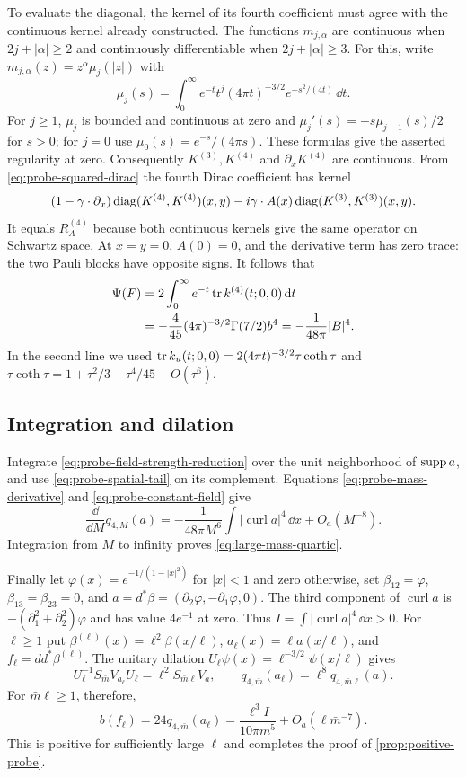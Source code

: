 To evaluate the diagonal, the kernel of its fourth coefficient must
agree with the continuous kernel already constructed. The functions
$m_{j,\alpha}$ are continuous when $2j+|\alpha|\ge2$ and continuously
differentiable when $2j+|\alpha|\ge3$. For this, write
$m_{j,\alpha}(z)=z^\alpha\mu_j(|z|)$ with
\[
 \mu_j(s)=\int_0^\infty e^{-t}t^j(4\pi t)^{-3/2}e^{-s^2/(4t)}\,\dd t.
\]
For $j\ge1$, $\mu_j$ is bounded and continuous at zero and
$\mu_j'(s)=-s\mu_{j-1}(s)/2$ for $s>0$; for $j=0$ use
$\mu_0(s)=e^{-s}/(4\pi s)$. These formulas give the asserted
regularity at zero. Consequently $K^{(3)},K^{(4)}$ and
$\partial_xK^{(4)}$ are continuous. From
\eqref{eq:probe-squared-dirac} the fourth Dirac coefficient has kernel
\[
 (1-\gamma\cdot\partial_x)\operatorname{diag}(K^{(4)},K^{(4)})(x,y)
       -i\gamma\cdot A(x)\operatorname{diag}(K^{(3)},K^{(3)})(x,y).
\]
It equals $R_A^{(4)}$ because both continuous kernels give the same
operator on Schwartz space. At $x=y=0$, $A(0)=0$, and the derivative
term has zero trace: the two Pauli blocks have opposite signs.
It follows that
\begin{align}
 \Psi(F)&=2\int_0^\infty e^{-t}\operatorname{tr} k^{(4)}(t;0,0)\,\mathrm d t\\
 &=-\frac4{45}(4\pi)^{-3/2}\Gamma(7/2)b^4
   =-\frac1{48\pi}|B|^4.\label{eq:probe-constant-field}
\end{align}
In the second line we used
$\operatorname{tr} k_u(t;0,0)=2(4\pi t)^{-3/2}\tau\coth\tau$ and
$\tau\coth\tau=1+\tau^2/3-\tau^4/45+O(\tau^6)$.

\subsection{Integration and dilation}

Integrate \eqref{eq:probe-field-strength-reduction} over the unit
neighborhood of $\operatorname{supp} a$, and use \eqref{eq:probe-spatial-tail}
on its complement. Equations \eqref{eq:probe-mass-derivative} and
\eqref{eq:probe-constant-field} give
\[
 \frac{\dd}{\dd M}q_{4,M}(a)
 =-\frac1{48\pi M^6}\int|\operatorname{curl}a|^4\,\dd x
                                    +O_a(M^{-8}).
\]
Integration from $M$ to infinity proves
\eqref{eq:large-mass-quartic}.

Finally let $\varphi(x)=e^{-1/(1-|x|^2)}$ for $|x|<1$ and zero
otherwise, set $\beta_{12}=\varphi$, $\beta_{13}=\beta_{23}=0$, and
$a=d^*\beta=(\partial_2\varphi,-\partial_1\varphi,0)$.
The third component of $\operatorname{curl}a$ is
$-(\partial_1^2+\partial_2^2)\varphi$ and has value $4e^{-1}$ at zero.
Thus $I=\int|\operatorname{curl}a|^4\,\dd x>0$.
For $\ell\ge1$ put
$\beta^{(\ell)}(x)=\ell^2\beta(x/\ell)$,
$a_\ell(x)=\ell a(x/\ell)$, and $f_\ell=dd^*\beta^{(\ell)}$.
The unitary dilation $U_\ell\psi(x)=\ell^{-3/2}\psi(x/\ell)$ gives
\[
 U_\ell^{-1}S_{\bar m}V_{a_\ell}U_\ell
       =\ell^2S_{\bar m\ell}V_a,
 \qquad q_{4,\bar m}(a_\ell)=\ell^8q_{4,\bar m\ell}(a).
\]
For $\bar m\ell\ge1$, therefore,
\begin{equation}\label{eq:probe-positive-dilation}
 b(f_\ell)=24q_{4,\bar m}(a_\ell)
   =\frac{\ell^3I}{10\pi\bar m^5}
                      +O_a(\ell\bar m^{-7}).
\end{equation}
This is positive for sufficiently large $\ell$ and completes the proof
of \cref{prop:positive-probe}.



